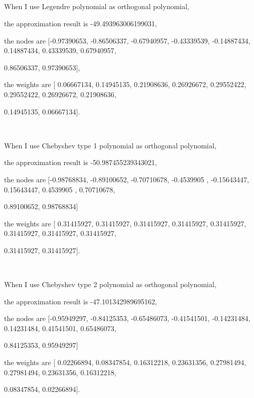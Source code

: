 \documentclass{article}
\begin{document}
	\subsection{}
		When I use Legendre polynomial as orthogonal polynomial, 
		\par
		the approximation result is -49.493963006199031,
		\par
		the nodes are [-0.97390653, -0.86506337, -0.67940957, -0.43339539, -0.14887434,
         0.14887434,  0.43339539,  0.67940957, \par 0.86506337,  0.97390653],\par
		the weights are [ 0.06667134,  0.14945135,  0.21908636,  0.26926672,  0.29552422,
         0.29552422,  0.26926672,  0.21908636, \par 0.14945135,  0.06667134].
		\par
		\ 
		\par
		When I use Chebyshev type 1 polynomial as orthogonal polynomial, 
		\par
		the approximation result is -50.987455239343021,
		\par
		the nodes are [-0.98768834, -0.89100652, -0.70710678, -0.4539905 , -0.15643447,
         0.15643447,  0.4539905 ,  0.70710678, \par 0.89100652,  0.98768834]\par
		the weights are [ 0.31415927,  0.31415927,  0.31415927,  0.31415927,  0.31415927,
         0.31415927,  0.31415927,  0.31415927, \par 0.31415927,  0.31415927].
		\par
		\ 
		\par
		When I use Chebyshev type 2 polynomial as orthogonal polynomial, 
		\par
		the approximation result is -47.101342989695162,
		\par
		the nodes are [-0.95949297, -0.84125353, -0.65486073, -0.41541501, -0.14231484,
         0.14231484,  0.41541501,  0.65486073, \par 0.84125353,  0.95949297]\par
		the weights are [ 0.02266894,  0.08347854,  0.16312218,  0.23631356,  0.27981494,
         0.27981494,  0.23631356,  0.16312218, \par 0.08347854,  0.02266894].
\section{}
	
\end{document}
